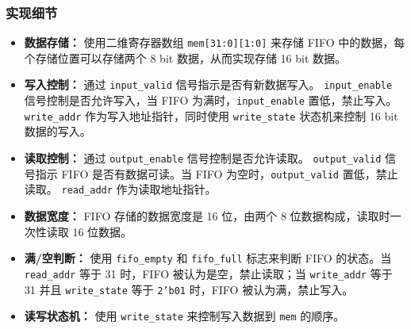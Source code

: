 \documentclass[zihao=5, UTF8]{article}
\theoremstyle{MyLineTheoremStyle} %
\theoremstyle{MyBlockTheoremStyle} %
\theoremstyle{MySubsubsectionStyle} %
\begin{document}
\subsubsection{实现细节}
\begin{itemize}
    \item \textbf{数据存储：} 使用二维寄存器数组 \texttt{mem[31:0][1:0]} 来存储 FIFO 中的数据，每个存储位置可以存储两个 8 bit 数据，从而实现存储 16 bit 数据。
    \item \textbf{写入控制：} 通过 \texttt{input\_valid} 信号指示是否有新数据写入。 \texttt{input\_enable} 信号控制是否允许写入，当 FIFO 为满时，\texttt{input\_enable} 置低，禁止写入。 \texttt{write\_addr} 作为写入地址指针，同时使用 \texttt{write\_state} 状态机来控制 16 bit 数据的写入。
    \item \textbf{读取控制：} 通过 \texttt{output\_enable} 信号控制是否允许读取。 \texttt{output\_valid} 信号指示 FIFO 是否有数据可读。当 FIFO 为空时，\texttt{output\_valid} 置低，禁止读取。 \texttt{read\_addr} 作为读取地址指针。
    \item \textbf{数据宽度：} FIFO 存储的数据宽度是 16 位，由两个 8 位数据构成，读取时一次性读取 16 位数据。
    \item \textbf{满/空判断：} 使用 \texttt{fifo\_empty} 和 \texttt{fifo\_full} 标志来判断 FIFO 的状态。当 \texttt{read\_addr} 等于 31 时，FIFO 被认为是空，禁止读取；当 \texttt{write\_addr} 等于 31 并且 \texttt{write\_state} 等于 \texttt{2'b01} 时，FIFO 被认为满，禁止写入。
    \item \textbf{读写状态机：} 使用 \texttt{write\_state} 来控制写入数据到 \texttt{mem} 的顺序。
\end{itemize}
\end{document}
